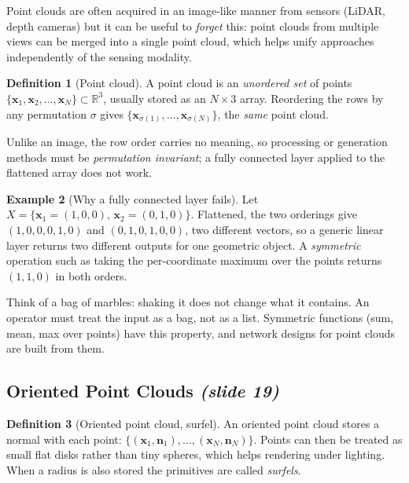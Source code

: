 \documentclass[11pt,a4paper]{article}
\newcommand{\R}{\mathbb{R}}
\newcommand{\vx}{\bm{x}}
\newcommand{\vn}{\bm{n}}
\theoremstyle{definition}
\newtheorem{definition}{Definition}[section]
\newtheorem{example}[definition]{Example}
\theoremstyle{plain}
\theoremstyle{remark}
\newcommand{\slides}[1]{\texorpdfstring{\emph{(#1)}}{(#1)}}
\begin{document}
Point clouds are often acquired in an image-like manner from sensors (LiDAR, depth cameras) but it can be useful to \emph{forget} this: point clouds from multiple views can be merged into a single point cloud, which helps unify approaches independently of the sensing modality.

\begin{definition}[Point cloud]
A point cloud is an \emph{unordered set} of points $\{\vx_1,\vx_2,\dots,\vx_N\}\subset\R^3$, usually stored as an $N\times 3$ array. Reordering the rows by any permutation $\sigma$ gives $\{\vx_{\sigma(1)},\dots,\vx_{\sigma(N)}\}$, the \emph{same} point cloud.
\end{definition}

Unlike an image, the row order carries no meaning, so processing or generation methods must be \emph{permutation invariant}; a fully connected layer applied to the flattened array does not work.

\begin{example}[Why a fully connected layer fails]
Let $X=\{\vx_1=(1,0,0),\,\vx_2=(0,1,0)\}$. Flattened, the two orderings give $(1,0,0,0,1,0)$ and $(0,1,0,1,0,0)$, two different vectors, so a generic linear layer returns two different outputs for one geometric object. A \emph{symmetric} operation such as taking the per-coordinate maximum over the points returns $(1,1,0)$ in both orders.
\end{example}

\begin{intuition}
Think of a bag of marbles: shaking it does not change what it contains. An operator must treat the input as a bag, not as a list. Symmetric functions (sum, mean, max over points) have this property, and network designs for point clouds are built from them.
\end{intuition}

\subsection{Oriented Point Clouds \slides{slide 19}}
\begin{definition}[Oriented point cloud, surfel]
An oriented point cloud stores a normal with each point: $\{(\vx_1,\vn_1),\dots,(\vx_N,\vn_N)\}$. Points can then be treated as small flat disks rather than tiny spheres, which helps rendering under lighting. When a radius is also stored the primitives are called \emph{surfels}.
\end{definition}
\end{document}
